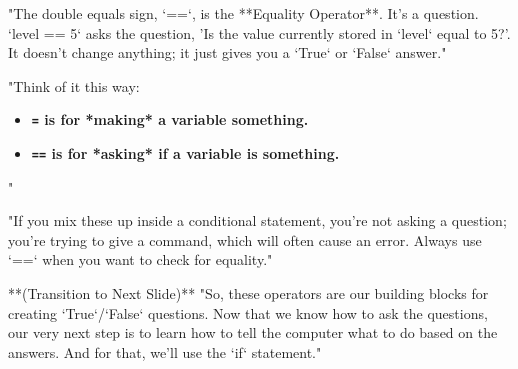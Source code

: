 \documentclass{beamer}
\begin{document}
\begin{frame}[fragile]
{        "The double equals sign, `==`, is the **Equality Operator**. It's a question. `level == 5` asks the question, 'Is the value currently stored in `level` equal to 5?'. It doesn't change anything; it just gives you a `True` or `False` answer."
        
        "Think of it this way:
        \begin{itemize}
            \item \textbf{\texttt{=} is for *making* a variable something.}
            \item \textbf{\texttt{==} is for *asking* if a variable is something.}
        \end{itemize}"
        
        "If you mix these up inside a conditional statement, you're not asking a question; you're trying to give a command, which will often cause an error. Always use `==` when you want to check for equality."
        
        **(Transition to Next Slide)**
        "So, these operators are our building blocks for creating `True`/`False` questions. Now that we know how to ask the questions, our very next step is to learn how to tell the computer what to do based on the answers. And for that, we'll use the `if` statement."
    }
\end{frame}
\end{document}
